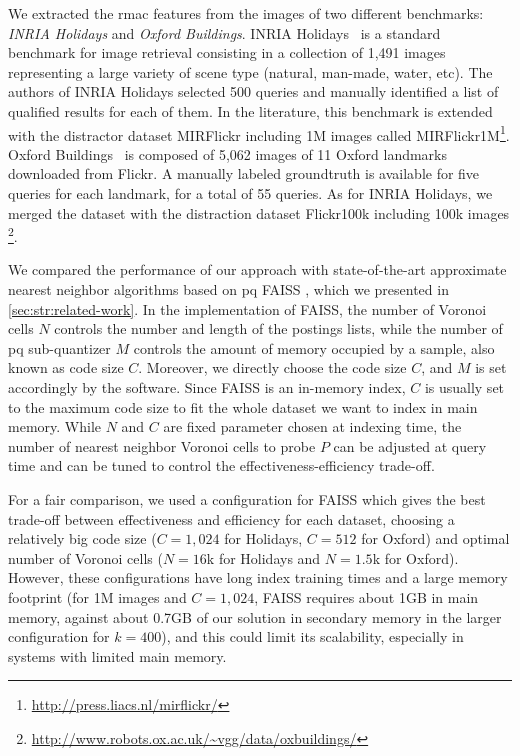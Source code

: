 We extracted the \gls{rmac} features from the images of two different benchmarks: \emph{INRIA Holidays} and \emph{Oxford Buildings}.
INRIA Holidays~\cite{jegou2008hamming} is a standard benchmark for image retrieval consisting in a collection of 1,491 images representing a large variety of scene type (natural, man-made, water, etc).
The authors of INRIA Holidays selected 500 queries and manually identified a list of qualified results for each of them.
In the literature, this benchmark is extended with the distractor dataset MIRFlickr including 1M images called MIRFlickr1M\footnote{\url{http://press.liacs.nl/mirflickr/}}.
Oxford Buildings~\cite{philbin2007object} is composed of 5,062 images of 11 Oxford landmarks downloaded from Flickr.
A manually labeled groundtruth is available for five queries for each landmark, for a total of 55 queries.
As for INRIA Holidays, we merged the dataset with the distraction dataset Flickr100k including 100k images \footnote{\url{http://www.robots.ox.ac.uk/~vgg/data/oxbuildings/}}.

We compared the performance of our approach with state-of-the-art approximate nearest neighbor algorithms based on \gls{pq} FAISS \cite{johnson2017billion}, which we presented in \ref{sec:str:related-work}.
In the implementation of FAISS, the number of Voronoi cells $N$ controls the number and length of the postings lists, while the number of \gls{pq} sub-quantizer $M$ controls the amount of memory occupied by a sample, also known as code size $C$.
Moreover, we directly choose the code size $C$, and $M$ is set accordingly by the software.
Since FAISS is an in-memory index, $C$ is usually set to the maximum code size to fit the whole dataset we want to index in main memory.
While $N$ and $C$ are fixed parameter chosen at indexing time, the number of nearest neighbor Voronoi cells to probe $P$ can be adjusted at query time and can be tuned to control the effectiveness-efficiency trade-off.

For a fair comparison, we used a configuration for FAISS which gives the best trade-off between effectiveness and efficiency for each dataset, choosing a relatively big code size ($C=1,024$ for Holidays, $C=512$ for Oxford) and optimal number of Voronoi cells ($N = 16$k for Holidays and $N=1.5$k for Oxford).
However, these configurations have long index training times and a large memory footprint (for 1M images and $C=1,024$, FAISS requires about 1GB in main memory, against about 0.7GB of our solution in secondary memory in the larger configuration for $k=400$), and this could limit its scalability, especially in systems with limited main memory.


